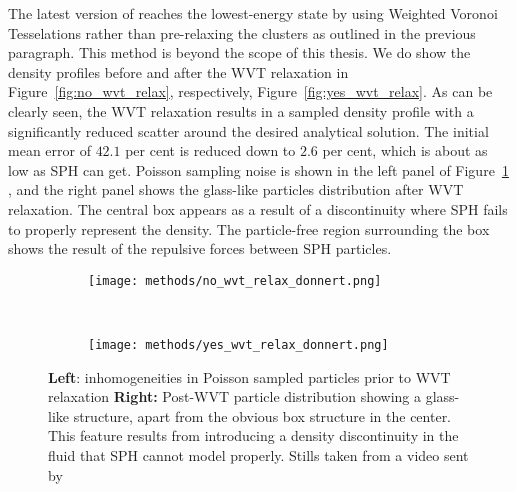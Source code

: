 \documentclass[MScProj_TLRH_ClusterEnergy.tex]{subfiles}
\begin{document}

The latest version of  reaches the lowest-energy state by using 
Weighted Voronoi Tesselations 
\citep[WVT;][]{2003MNRAS.342..345C, 2006MNRAS.368..497D, 2012arXiv1211.0525D} rather
than pre-relaxing the clusters as outlined in the previous paragraph. This method 
is beyond the scope of this thesis. We do show the density profiles before and
after the WVT relaxation in Figure~\ref{fig:no_wvt_relax}, respectively,
Figure~\ref{fig:yes_wvt_relax}. As can be clearly seen, the WVT relaxation 
results in a sampled density profile with a significantly reduced scatter around
the desired analytical solution. The initial mean error of $42.1$ per cent is
reduced down to $2.6$ per cent, which is about as low as SPH can get. Poisson
sampling noise is shown in the left panel of Figure~\ref{fig:glass}
\citep[priv. comm.]{DonnertWVT}, and the right panel shows the glass-like 
particles distribution after WVT relaxation. The central box appears as a result
of a discontinuity where SPH fails to properly represent the density. The 
particle-free region surrounding the box shows the result of the repulsive forces
between SPH particles.

\begin{figure}[ht]
  \centering
  \begin{subfigure}[b]{.5\textwidth}
    \centering
    \texttt{[image: methods/no\_wvt\_relax\_donnert.png]}
  \end{subfigure}%
  ~
  \begin{subfigure}[b]{.5\textwidth}
    \centering
    \texttt{[image: methods/yes\_wvt\_relax\_donnert.png]}
    \end{subfigure}
    \caption{\textbf{Left}: inhomogeneities in Poisson sampled particles
             prior to WVT relaxation \textbf{Right:} Post-WVT particle distribution
             showing a glass-like structure, apart from the obvious box structure 
             in the center. This feature results from introducing a density 
             discontinuity in the fluid that SPH cannot model properly.
             Stills taken from a video sent by \citet[priv. comm.]{DonnertWVT}}
    \label{fig:glass}
\end{figure}
\end{document}
